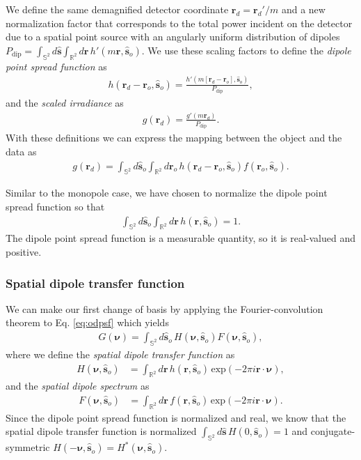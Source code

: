 \documentclass[]{osa-article}
\providecommand{\mb}[1]{\mathbf{#1}}
\providecommand{\ro}{\mathbf{\mathbf{r}}_o}
\providecommand{\so}{\mathbf{\hat{s}}_o}
\providecommand{\rd}{\mathbf{r}_d}
\providecommand{\mh}[1]{\mathbf{\hat{#1}}}
\providecommand{\mbb}[1]{\mathbb{#1}}
\providecommand{\bs}[1]{\boldsymbol{#1}}
\providecommand{\bv}{\bs{\nu}}
\begin{document}
We define the same demagnified detector coordinate $\rd = \rd'/m$ and a new
normalization factor that corresponds to the total power incident on the
detector due to a spatial point source with an angularly uniform distribution of
dipoles
$P_\text{dip} = \int_{\mbb{S}^2}d\mh{s}\int_{\mbb{R}^2}d\mb{r}\, h'(m\mb{r},
\so)$. We use these scaling factors to define the
\textit{dipole point spread function} as
\begin{align}
  h(\rd - \ro, \so) = \frac{h'(m[\rd - \ro], \so)}{P_\text{dip}}, 
\end{align}
and the \textit{scaled irradiance} as 
\begin{align}
  g(\rd) = \frac{g'(m\rd)}{P_\text{dip}}. 
\end{align}
With these definitions we can express the mapping between the object and the
data as
\begin{align}
g(\rd{}) = \int_{\mbb{S}^2}d\so{}\int_{\mbb{R}^2}d\ro{}\, h(\rd{} -\ro{}, \so{})f(\ro, \so). \label{eq:odpsf}
\end{align}

Similar to the monopole case, we have chosen to normalize the dipole point
spread function so that
\begin{align}
  \int_{\mbb{S}^2}d\so\int_{\mbb{R}^2}d\mb{r}\, h(\mb{r}, \so) = 1. 
\end{align}
The dipole point spread function is a measurable quantity, so it is real-valued
and positive.

\subsubsection{Spatial dipole transfer function}
We can make our first change of basis by applying the Fourier-convolution
theorem to Eq. \ref{eq:odpsf} which yields
\begin{align}
G(\bv) = \int_{\mbb{S}^2}d\so\, H(\bv, \so)F(\bv, \so) \label{eq:odotf},
\end{align}
where we define the \textit{spatial dipole transfer function} as
  \begin{align}
  H(\bv, \so) &= \int_{\mbb{R}^2}d\mb{r}\, h(\mb{r}, \so)\, \text{exp}(-2\pi i\mb{r}\cdot\bv),
  \end{align}
  and the \textit{spatial dipole spectrum} as
  \begin{align}
  F(\bv, \so) &= \int_{\mbb{R}^2}d\mb{r}\, f(\mb{r}, \so)\, \text{exp}(-2\pi i\mb{r}\cdot\bv). 
  \end{align}
  Since the dipole point spread function is normalized and real, we know that
  the spatial dipole transfer function is normalized
  $\int_{\mbb{S}^2}d\mh{s}\, H(0, \so) = 1$ and conjugate-symmetric
  $H(-\bv, \so) = H^*(\bv, \so)$.
  
\end{document}
